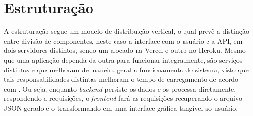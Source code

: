 \section{Estruturação}
A estruturação segue um modelo de distribuição vertical, o qual prevê a distinção entre divisão de componentes, neste caso a interface com o usuário e a API, em dois servidores distintos, sendo um alocado na Vercel e outro no Heroku. Mesmo que uma aplicação dependa da outra para funcionar integralmente, são serviços distintos e que melhoram de maneira geral o funcionamento do sistema, visto que tais responsabilidades distintas melhoram o tempo de carregamento de acordo com . Ou seja, enquanto \textit{backend} persiste os dados e os processa diretamente, respondendo a requisições, o \textit{frontend} fará as requisições recuperando o arquivo JSON gerado e o transformando em uma interface gráfica tangível ao usuário.


